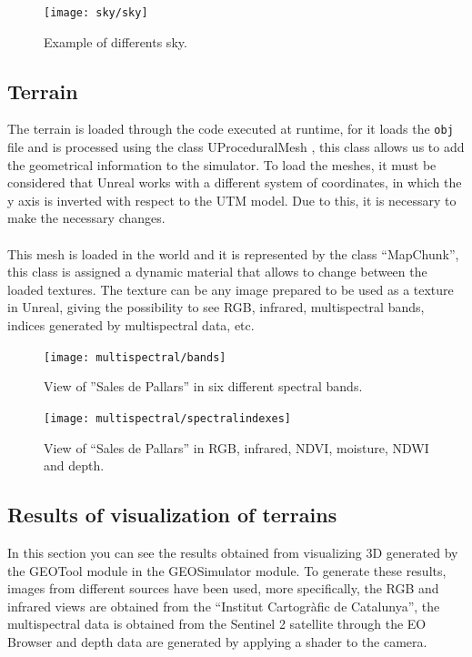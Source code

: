 \documentclass[10pt,a4paper,twocolumn,twoside]{article}
\begin{document}
\begin{figure}[h]
\centering
  	\texttt{[image: sky/sky]}
	\caption{Example of differents sky.}
	\label{fig-sky}
\end{figure}

\subsection{Terrain}
The terrain is loaded through the code executed at runtime, for it loads the \texttt{obj} file and is processed using the class UProceduralMesh \cite{uprocedural}, this class allows us to add the geometrical information to the simulator. To load the meshes, it must be considered that Unreal works with a different system of coordinates, in which the y axis is inverted with respect to the UTM model. Due to this, it is necessary to make the necessary changes.
\\
\\
This mesh is loaded in the world and it is represented by the class ``MapChunk'', this class is assigned a dynamic material that allows to change between the loaded textures. The texture can be any image prepared to be used as a texture in Unreal, giving the possibility to see RGB, infrared, multispectral bands, indices generated by multispectral data, etc.

\begin{figure}[h]
\centering
    \texttt{[image: multispectral/bands]}
  \caption{View of ''Sales de Pallars'' in six different spectral bands.}
  \label{fig-bands}
\end{figure}

\begin{figure}[h]
\centering
  	\texttt{[image: multispectral/spectralindexes]}
	\caption{View of ``Sales de Pallars'' in RGB, infrared, NDVI, moisture, NDWI and depth.}
	\label{fig-spectralindexes}
\end{figure}

\subsection{Results of visualization of terrains}
In this section you can see the results obtained from visualizing 3D generated by the GEOTool module in the GEOSimulator module. To generate these results, images from different sources have been used, more specifically, the RGB and infrared views are obtained from the ``Institut Cartogràfic de Catalunya'', the multispectral data is obtained from the Sentinel 2 \cite{sentinel2} satellite through the EO Browser \cite{eobrowser} and depth data are generated by applying a shader to the camera.
\\
\\
\end{document}
